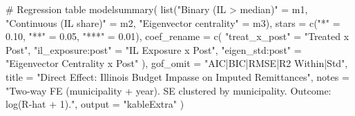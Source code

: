 \documentclass[
  11pt,
  letterpaper,
  DIV=11,
  numbers=noendperiod]{scrartcl}
\newenvironment{Shaded}{}{}
\newcommand{\AttributeTok}[1]{\textcolor[rgb]{0.84,0.23,0.29}{#1}}
\newcommand{\CommentTok}[1]{\textcolor[rgb]{0.42,0.45,0.49}{#1}}
\newcommand{\FloatTok}[1]{\textcolor[rgb]{0.00,0.36,0.77}{#1}}
\newcommand{\FunctionTok}[1]{\textcolor[rgb]{0.44,0.26,0.76}{#1}}
\newcommand{\NormalTok}[1]{\textcolor[rgb]{0.14,0.16,0.18}{#1}}
\newcommand{\OtherTok}[1]{\textcolor[rgb]{0.44,0.26,0.76}{#1}}
\newcommand{\StringTok}[1]{\textcolor[rgb]{0.01,0.18,0.38}{#1}}
\begin{document}
\begin{Shaded}
\begin{Highlighting}[]
\CommentTok{\# Regression table}
\FunctionTok{modelsummary}\NormalTok{(}
  \FunctionTok{list}\NormalTok{(}\StringTok{"Binary (IL \textgreater{} median)"} \OtherTok{=}\NormalTok{ m1,}
       \StringTok{"Continuous (IL share)"} \OtherTok{=}\NormalTok{ m2,}
       \StringTok{"Eigenvector centrality"} \OtherTok{=}\NormalTok{ m3),}
  \AttributeTok{stars      =} \FunctionTok{c}\NormalTok{(}\StringTok{"*"} \OtherTok{=} \FloatTok{0.10}\NormalTok{, }\StringTok{"**"} \OtherTok{=} \FloatTok{0.05}\NormalTok{, }\StringTok{"***"} \OtherTok{=} \FloatTok{0.01}\NormalTok{),}
  \AttributeTok{coef\_rename =} \FunctionTok{c}\NormalTok{(}
    \StringTok{"treat\_x\_post"}     \OtherTok{=} \StringTok{"Treated x Post"}\NormalTok{,}
    \StringTok{"il\_exposure:post"} \OtherTok{=} \StringTok{"IL Exposure x Post"}\NormalTok{,}
    \StringTok{"eigen\_std:post"}   \OtherTok{=} \StringTok{"Eigenvector Centrality x Post"}
\NormalTok{  ),}
  \AttributeTok{gof\_omit   =} \StringTok{"AIC|BIC|RMSE|R2 Within|Std"}\NormalTok{,}
  \AttributeTok{title      =} \StringTok{"Direct Effect: Illinois Budget Impasse on Imputed Remittances"}\NormalTok{,}
  \AttributeTok{notes      =} \StringTok{"Two{-}way FE (municipality + year). SE clustered by municipality. Outcome: log(R{-}hat + 1)."}\NormalTok{,}
  \AttributeTok{output     =} \StringTok{"kableExtra"}
\NormalTok{)}
\end{Highlighting}
\end{Shaded}
\end{document}
